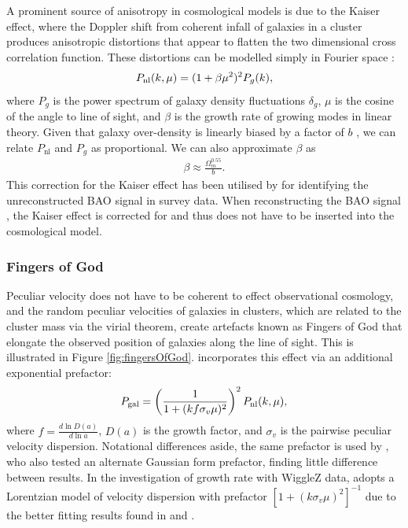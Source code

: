 \documentclass[titlesmallcaps, examinerscopy, copyrightpage]{uqthesis}
\begin{document}
A prominent source of anisotropy in cosmological models is due to the Kaiser effect, where the Doppler shift from coherent infall of galaxies in a cluster produces anisotropic distortions that appear to flatten the two dimensional cross correlation function. These distortions can be modelled simply in Fourier space \citep{Kaiser1987}:
\begin{align} \label{eq:gaztanga1}
P_{\rm{nl}}(k, \mu) = (1 + \beta \mu^2)^2 P_{g}(k),
\end{align}
where $P_{g}$ is the power spectrum of galaxy density fluctuations $\delta_g$, $\mu$ is the cosine of the angle to line of sight, and $\beta$ is the growth rate of growing modes in linear theory. Given that galaxy over-density is linearly biased by a factor of $b$ \citep{ReidSpergelBode2009}, we can relate $P_{\text{nl}}$ and $P_{g}$ as proportional. We can also approximate $\beta$ as \citep{Linder2005}
\begin{align}
\beta \approx \frac{\Omega_m^{0.55}}{b}.
\end{align}
This correction for the Kaiser effect has been utilised by \citet{ChuangWang2012, XuPadmanabhan2012, Gaztanaga2009} for identifying the unreconstructed BAO signal in survey data. When reconstructing the BAO signal \citep[see][for details]{KazinKoda2014,PadmanabhanXuEisenstein2012}, the Kaiser effect is corrected for and thus does not have to be inserted into the cosmological model.



\subsubsection{Fingers of God}

Peculiar velocity does not have to be coherent to effect observational cosmology, and the random peculiar velocities of galaxies in clusters, which are related to the cluster mass via the virial theorem, create artefacts known as Fingers of God that elongate the observed position of galaxies along the line of sight. This is illustrated in Figure \ref{fig:fingersOfGod}. \citet{SanchezKazinBeutler2013} incorporates this effect via an additional exponential prefactor:
\begin{align}
P_{\rm{gal}} = \left( \frac{1}{1 + (k f \sigma_v \mu )^2} \right)^2  P_{\rm{nl}}(k, \mu), \label{eq:lorentzian}
\end{align}
where $f = \frac{d \ln D(a)}{d \ln a}$, $D(a)$ is the growth factor, and $\sigma_v$ is the pairwise peculiar velocity dispersion. Notational differences aside, the same prefactor is used by \citet{XuPadmanabhan2012}, who also tested an alternate Gaussian form prefactor, finding little difference between results. In the investigation of growth rate with WiggleZ data, \citet{BlakeBroughColless2011} adopts a Lorentzian model of velocity dispersion with prefactor $[1 + (k \sigma_v \mu)^2]^{-1}$ due to the better fitting results found in \citet{HawkinsMaddoxCole2003} and \citet{CabreGaztanaga2009}.
\end{document}
